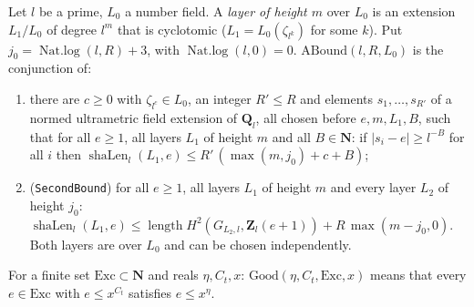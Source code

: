 \begin{definition}\label{def:S-abound}
Let $l$ be a prime, $L_0$ a number field. A \emph{layer of height $m$} over $L_0$ is an extension $L_1/L_0$
of degree $l^m$ that is cyclotomic ($L_1=L_0(\zeta_{l^k})$ for some $k$). Put $j_0=\operatorname{Nat.log}(l,R)+3$, with $\operatorname{Nat.log}(l,0)=0$.
$\mathrm{ABound}(l,R,L_0)$ is the conjunction of:
\begin{enumerate}
\item there are $c\ge0$ with $\zeta_{l^c}\in L_0$, an integer $R'\le R$ and elements $s_1,\dots,s_{R'}$ of a
normed ultrametric field extension of $\mathbf{Q}_l$, all chosen before $e,m,L_1,B$, such that for all $e\ge1$, all layers $L_1$ of height $m$ and
all $B\in\mathbf{N}$: if $|s_i-e|\ge l^{-B}$ for all $i$ then
$\operatorname{shaLen}_l(L_1,e)\le R'\,(\max(m,j_0)+c+B)$;
\item (\texttt{SecondBound}) for all $e\ge1$, all layers $L_1$ of height $m$ and every layer $L_2$ of height
$j_0$: $\operatorname{shaLen}_l(L_1,e)\le\operatorname{length}H^2(G_{L_2,l},\mathbf{Z}_l(e+1))+R\,\max(m-j_0,0)$. Both layers are over $L_0$ and can be chosen independently.
\end{enumerate}
For a finite set $\mathrm{Exc}\subset\mathbf{N}$ and reals $\eta,C_t,x$: $\mathrm{Good}(\eta,C_t,\mathrm{Exc},x)$ means that every
$e\in\mathrm{Exc}$ with $e\le x^{C_t}$ satisfies $e\le x^{\eta}$.
\end{definition}

